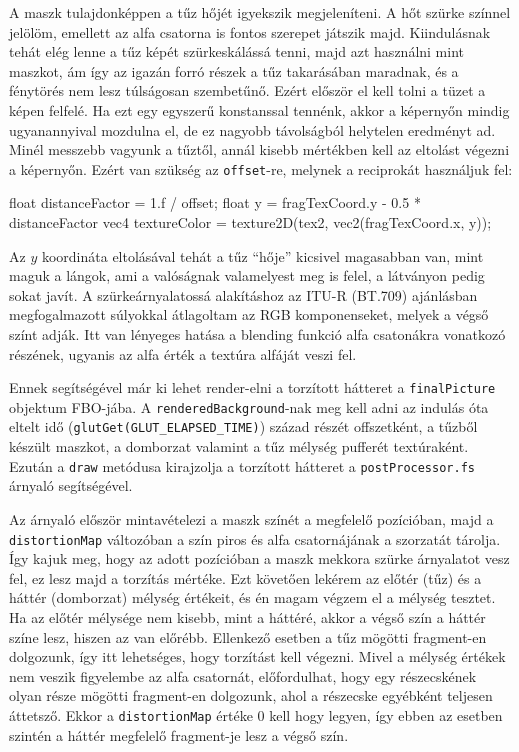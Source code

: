 A maszk tulajdonképpen a tűz hőjét igyekszik megjeleníteni. A hőt szürke színnel jelölöm, emellett az alfa csatorna is fontos szerepet játszik majd. Kiindulásnak tehát elég lenne a tűz képét szürkeskálássá tenni, majd azt használni mint maszkot, ám így az igazán forró részek a tűz takarásában maradnak, és a fénytörés nem lesz túlságosan szembetűnő. Ezért először el kell tolni a tüzet a képen felfelé. Ha ezt egy egyszerű konstanssal tennénk, akkor a képernyőn mindig ugyanannyival mozdulna el, de ez nagyobb távolságból helytelen eredményt ad. Minél messzebb vagyunk a tűztől, annál kisebb mértékben kell az eltolást végezni a képernyőn. Ezért van szükség az \texttt{offset}-re, melynek a reciprokát használjuk fel:
\begin{cpp}
float distanceFactor = 1.f / offset;
float y = fragTexCoord.y - 0.5 * distanceFactor
vec4 textureColor = texture2D(tex2, vec2(fragTexCoord.x, y));
\end{cpp}
Az $y$ koordináta eltolásával tehát a tűz ``hője'' kicsivel magasabban van, mint maguk a lángok, ami a valóságnak valamelyest meg is felel, a látványon pedig sokat javít. A szürkeárnyalatossá alakításhoz az ITU-R (BT.709) ajánlásban megfogalmazott súlyokkal átlagoltam az RGB komponenseket, melyek a végső színt adják. Itt van lényeges hatása a blending funkció alfa csatonákra vonatkozó részének, ugyanis az alfa érték a textúra alfáját veszi fel.

Ennek segítségével már ki lehet render-elni a torzított hátteret a \texttt{finalPicture} objektum FBO-jába. A \texttt{renderedBackground}-nak meg kell adni az indulás óta eltelt idő (\texttt{glutGet(GLUT\_ELAPSED\_TIME)}) század részét offszetként, a tűzből készült maszkot, a domborzat valamint a tűz mélység pufferét textúraként. Ezután a \texttt{draw} metódusa kirajzolja a torzított hátteret a \texttt{postProcessor.fs} árnyaló segítségével.

Az árnyaló először mintavételezi a maszk színét a megfelelő pozícióban, majd a \texttt{distortionMap} változóban a szín piros és alfa csatornájának a szorzatát tárolja. Így kajuk meg, hogy az adott pozícióban a maszk mekkora szürke árnyalatot vesz fel, ez lesz majd a torzítás mértéke. 
Ezt követően lekérem az előtér (tűz) és a háttér (domborzat) mélység értékeit, és én magam végzem el a mélység tesztet. Ha az előtér mélysége nem kisebb, mint a háttéré, akkor a végső szín a háttér színe lesz, hiszen az van előrébb. Ellenkező esetben a tűz mögötti fragment-en dolgozunk, így itt lehetséges, hogy torzítást kell végezni. Mivel a mélység értékek nem veszik figyelembe az alfa csatornát, előfordulhat, hogy egy részecskének olyan része mögötti fragment-en dolgozunk, ahol a részecske egyébként teljesen áttetsző. Ekkor a \texttt{distortionMap} értéke $0$ kell hogy legyen, így ebben az esetben szintén a háttér megfelelő fragment-je lesz a végső szín. 

